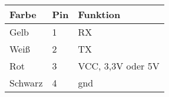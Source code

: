     \begin{center}
    \begin{tabular}{l|l|l}
        Farbe & Pin & Funktion \\ \hline
        Gelb    & 1   & RX\\
        Weiß    & 2   & TX \\
        Rot     & 3   & VCC,  3,3V oder 5V \\
        Schwarz & 4   & \acs{gnd} \\
        
    \end{tabular}
    \label{GrovePinBelegungUART}
\end{center}


